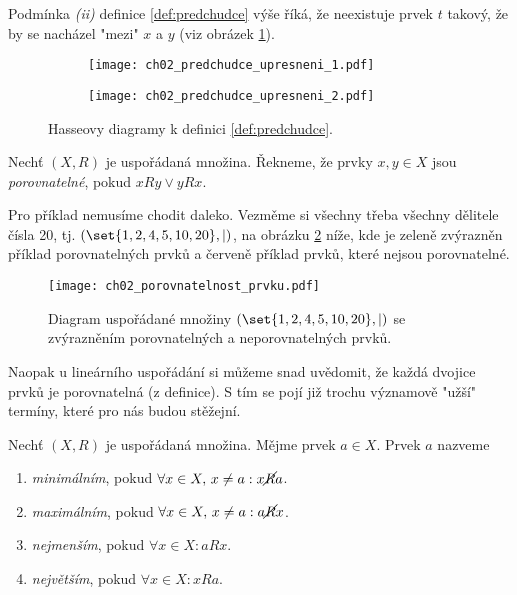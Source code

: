 Podmínka \textit{(ii)} definice \ref{def:predchudce} výše říká, že neexistuje prvek $t$ takový, že by se nacházel "mezi" $x$ a $y$ (viz obrázek \ref{fig:predchudce_upresneni}).
\begin{figure}[h]
    \centering
    \begin{subfigure}{6cm}
        \centering
        \texttt{[image: ch02\_predchudce\_upresneni\_1.pdf]}
    \end{subfigure}
    \qquad
    \begin{subfigure}{6cm}
        \centering
        \texttt{[image: ch02\_predchudce\_upresneni\_2.pdf]}
    \end{subfigure}
    \caption{Hasseovy diagramy k definici \ref{def:predchudce}.}
    \label{fig:predchudce_upresneni}
\end{figure}
\begin{definition}
    Nechť $(X,R)$ je uspořádaná množina. Řekneme, že prvky $x,y\in X$ jsou \emph{porovnatelné}, pokud $xRy \lor yRx$.
\end{definition}
Pro příklad nemusíme chodit daleko. Vezměme si všechny třeba všechny dělitele čísla 20, tj. $(\set{1,2,4,5,10,20},\mid)$, na obrázku \ref{fig:porovnatelnost_prvku} níže, kde je zeleně zvýrazněn příklad porovnatelných prvků a červeně příklad prvků, které nejsou porovnatelné.
\begin{figure}[h]
    \centering
    \texttt{[image: ch02\_porovnatelnost\_prvku.pdf]}
    \caption{Diagram uspořádané množiny $(\set{1,2,4,5,10,20},\mid)$ se zvýrazněním porovnatelných a neporovnatelných prvků.}
    \label{fig:porovnatelnost_prvku}
\end{figure}
Naopak u lineárního uspořádání si můžeme snad uvědomit, že každá dvojice prvků je porovnatelná (z definice). S tím se pojí již trochu významově "užší" termíny, které pro nás budou stěžejní.
\begin{definition}
    Nechť $(X,R)$ je uspořádaná množina. Mějme prvek $a\in X$. Prvek $a$ nazveme
    \begin{enumerate}[label=(\roman*)]
        \item \emph{minimálním}, pokud $\forall x\in X,\,x\neq a: x\cancel{R}a$.
        \item \emph{maximálním}, pokud $\forall x\in X,\,x\neq a: a\cancel{R}x$.
        \item \emph{nejmenším}, pokud $\forall x\in X: aRx$.
        \item \emph{největším}, pokud $\forall x\in X: xRa$.
    \end{enumerate}
\end{definition}
